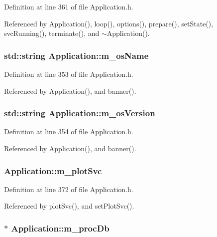 Definition at line 361 of file Application.h.

Referenced by Application(), loop(), options(), prepare(), setState(), svcRunning(), terminate(), and $\sim$Application().\hypertarget{classApplication_a59f90c6ff4ee3db646ca656c71cc77e7}{
\subsubsection[{m\_\-osName}]{\setlength{\rightskip}{0pt plus 5cm}std::string {\bf Application::m\_\-osName}}}
\label{classApplication_a59f90c6ff4ee3db646ca656c71cc77e7}


Definition at line 353 of file Application.h.

Referenced by Application(), and banner().\hypertarget{classApplication_a17949f767d2598e92acb0885bb399dc0}{
\subsubsection[{m\_\-osVersion}]{\setlength{\rightskip}{0pt plus 5cm}std::string {\bf Application::m\_\-osVersion}}}
\label{classApplication_a17949f767d2598e92acb0885bb399dc0}


Definition at line 354 of file Application.h.

Referenced by Application(), and banner().\hypertarget{classApplication_a30d5600ea5e4f36b14f25f903ee3256e}{
\subsubsection[{m\_\-plotSvc}]{ {\bf Application::m\_\-plotSvc}}}
\label{classApplication_a30d5600ea5e4f36b14f25f903ee3256e}


Definition at line 372 of file Application.h.

Referenced by plotSvc(), and setPlotSvc().\hypertarget{classApplication_af030cefeb69586f01e965606d5dd8919}{
\subsubsection[{m\_\-procDb}]{$\ast$ {\bf Application::m\_\-procDb}}}
\label{classApplication_af030cefeb69586f01e965606d5dd8919}


